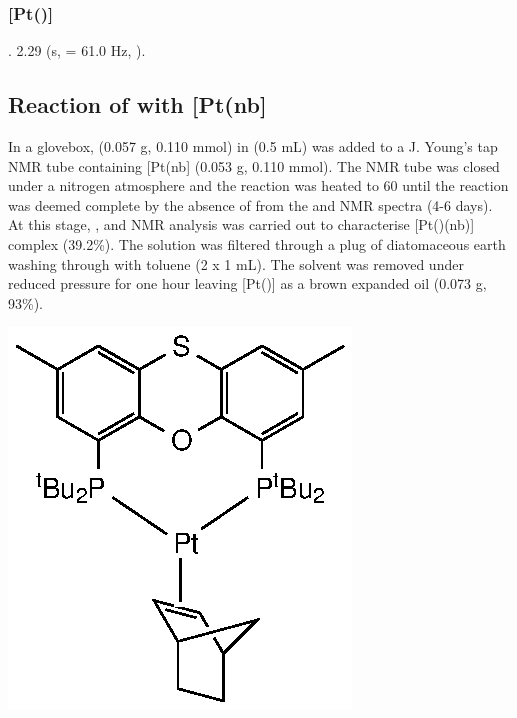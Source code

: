 \subsubsection{[Pt(\Phthixantphos)]}

.
2.29 (s, \JPtH{} = 61.0 Hz, ).
 
\subsection*{Reaction of \tButhixantphos{} with \texorpdfstring{[Pt(nb]} P} 

In a glovebox, \tButhixantphos{} (0.057 g, 0.110 mmol) in  (0.5 mL) was added to a J. Young's tap NMR tube containing [Pt(nb] (0.053 g, 0.110 mmol).  The NMR tube was closed under a nitrogen atmosphere and the reaction was heated to 60 \degC{} until the reaction was deemed complete by the absence of \tButhixantphos{} from the \phosphorus{} and \proton{} NMR spectra (4-6 days).  At this stage, \proton{}, \carbon{} and \phosphorus{} NMR analysis was carried out to characterise [Pt(\tButhixantphos)(nb)] complex (39.2\%).  The solution was filtered through a plug of diatomaceous earth washing through with toluene (2 x 1 mL).  The solvent was removed under reduced pressure for one hour leaving [Pt(\tButhixantphos)] as a brown expanded oil (0.073 g, 93\%).

\begin{structure}[h]
\begin{center}
\includegraphics{../Structures/StBuPlatinumnorbornene.eps}
\end{center}
\end{structure}

